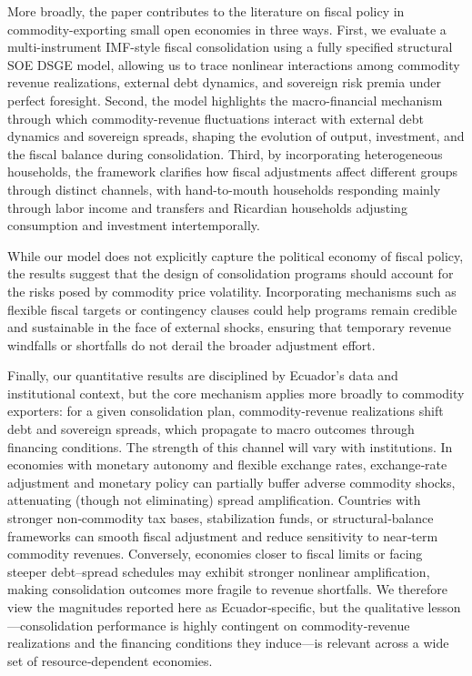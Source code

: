 \documentclass[12pt]{article}
\begin{document}
More broadly, the paper contributes to the literature on fiscal policy in commodity-exporting small open economies in three ways. First, we evaluate a multi-instrument IMF-style fiscal consolidation using a fully specified structural SOE DSGE model, allowing us to trace nonlinear interactions among commodity revenue realizations, external debt dynamics, and sovereign risk premia under perfect foresight. Second, the model highlights the macro-financial mechanism through which commodity-revenue fluctuations interact with external debt dynamics and sovereign spreads, shaping the evolution of output, investment, and the fiscal balance during consolidation. Third, by incorporating heterogeneous households, the framework clarifies how fiscal adjustments affect different groups through distinct channels, with hand-to-mouth households responding mainly through labor income and transfers and Ricardian households adjusting consumption and investment intertemporally.

While our model does not explicitly capture the political economy of fiscal policy, the results suggest that the design of consolidation programs should account for the risks posed by commodity price volatility. Incorporating mechanisms such as flexible fiscal targets or contingency clauses could help programs remain credible and sustainable in the face of external shocks, ensuring that temporary revenue windfalls or shortfalls do not derail the broader adjustment effort.

Finally, our quantitative results are disciplined by Ecuador’s data and institutional context, but the core mechanism applies more broadly to commodity exporters: for a given consolidation plan, commodity‑revenue realizations shift debt and sovereign spreads, which propagate to macro outcomes through financing conditions. The strength of this channel will vary with institutions. In economies with monetary autonomy and flexible exchange rates, exchange‑rate adjustment and monetary policy can partially buffer adverse commodity shocks, attenuating (though not eliminating) spread amplification. Countries with stronger non‑commodity tax bases, stabilization funds, or structural‑balance frameworks can smooth fiscal adjustment and reduce sensitivity to near‑term commodity revenues. Conversely, economies closer to fiscal limits or facing steeper debt–spread schedules may exhibit stronger nonlinear amplification, making consolidation outcomes more fragile to revenue shortfalls. We therefore view the magnitudes reported here as Ecuador‑specific, but the qualitative lesson—consolidation performance is highly contingent on commodity‑revenue realizations and the financing conditions they induce—is relevant across a wide set of resource‑dependent economies.
\end{document}
